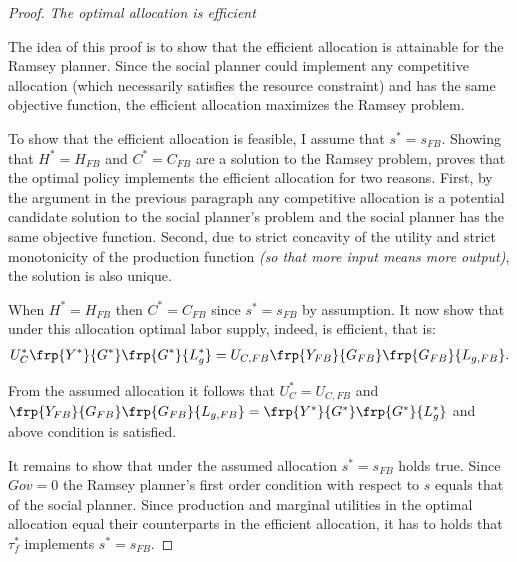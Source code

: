 \begin{proof}\textit{The optimal allocation is efficient}
	
	The idea of this proof is to show that the efficient allocation is attainable for the Ramsey planner. Since the social planner could implement any competitive allocation (which necessarily satisfies the resource constraint) and has the same objective function, the efficient allocation maximizes the Ramsey problem. 
	
	To show that the efficient allocation is feasible, I assume that $s^*=s_{FB}$. Showing that $H^*=H_{FB}$ and $C^*=C_{FB}$ are a solution to the Ramsey problem, proves that the optimal policy implements the efficient allocation for two reasons. First, by the argument in the previous paragraph any competitive allocation is a potential candidate solution to the social planner's problem and the social planner has the same objective function. Second, due to strict concavity of the utility and strict monotonicity of the production function \textit{(so that more input means more output)}, the solution is also unique.
	
	When $H^*=H_{FB}$ then $C^*=C_{FB}$ since $s^*=s_{FB}$ by assumption. It now show that under this allocation optimal labor supply, indeed, is efficient, that is:
	\begin{align}
	U_C^*\frp{Y^*}{G^*}\frp{G^*}{L^*_{g}} = U_{C,FB}\frp{Y_{FB}}{G_{FB}}\frp{G_{FB}}{L_{g,FB}}.
	\end{align}
	
	From the assumed allocation it follows that $U_C^*=U_{C,FB}$ and $\frp{Y_{FB}}{G_{FB}}\frp{G_{FB}}{L_{g,FB}}=\frp{Y^*}{G^*}\frp{G^*}{L^*_{g}}$ and above condition is satisfied. 
	
	It remains to show that under the assumed allocation $s^*=s_{FB}$ holds true. Since $Gov=0$ the Ramsey planner's first order condition with respect to $s$ equals that of the social planner. Since production and marginal utilities in the optimal allocation equal their counterparts in the efficient allocation, it has to holds that $\tau_f^*$ implements $s^*=s_{FB}$.  
	
\end{proof}


